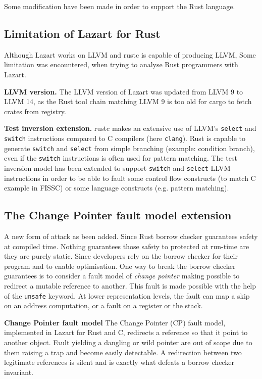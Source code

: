 \label{Section:Rust ported}
Some modification have been made in order to support the Rust language.

\subsection{Limitation of Lazart for Rust}

Although Lazart works on LLVM and rustc is capable of producing LLVM, Some limitation was encountered, when trying to analyse Rust programmers with Lazart.

\textbf{LLVM version.} The LLVM version of Lazart was updated from LLVM 9 to LLVM 14, as the Rust tool chain matching LLVM 9 is too old for cargo to fetch crates from registry.

\textbf{Test inversion extension.} rustc makes an extensive use of LLVM's \texttt{select} and \texttt{switch} instructions compared to C compilers (here \texttt{clang}).
Rust is capable to generate \texttt{switch} and \texttt{select} from simple branching (example: condition branch), even if the \texttt{switch} instructions is often used for pattern matching.
The test inversion model has been extended to support \texttt{switch} and \texttt{select} LLVM instructions in order to be able to fault some control flow constructs (to match C example in FISSC) or some language constructs (e.g. pattern matching). 

\subsection{The Change Pointer fault model extension}
\label{subsection:Change Pointer fault model}
A new form of attack as been added.
Since Rust borrow checker guarantees safety at compiled time. Nothing guarantees those safety to protected at run-time are they are purely static.
Since developers rely on the borrow checker for their program and to enable optimisation. One way to break the borrow checker guarantees is to consider a fault model of \textit{change pointer} making possible to redirect a mutable reference to another.
This fault is made possible with the help of the \texttt{unsafe} keyword.
At lower representation levels, the fault can map a skip on an address computation, or a fault on a register or the stack.

\textbf{Change Pointer fault model} The Change Pointer (CP) fault model, implemented in Lazart for Rust and C, redirects a reference so that it point to another object.
Fault yielding a dangling or wild pointer are out of scope due to them raising a trap and become easily detectable.
A redirection between two legitimate references is silent and is exactly what defeats a borrow checker invariant.


